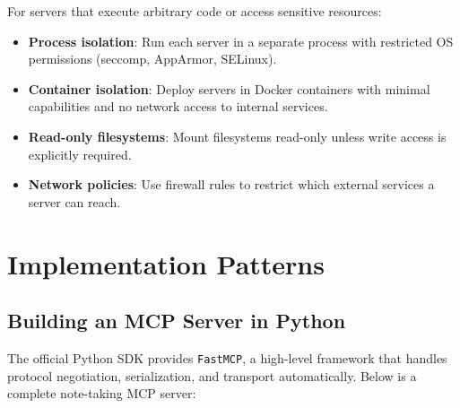 For servers that execute arbitrary code or access sensitive resources:

\begin{itemize}
  \item \textbf{Process isolation}: Run each server in a separate process with restricted OS permissions (seccomp, AppArmor, SELinux).
  \item \textbf{Container isolation}: Deploy servers in Docker containers with minimal capabilities and no network access to internal services.
  \item \textbf{Read-only filesystems}: Mount filesystems read-only unless write access is explicitly required.
  \item \textbf{Network policies}: Use firewall rules to restrict which external services a server can reach.
\end{itemize}

\section{Implementation Patterns}
\label{sec:mcp:implementation}

\subsection{Building an MCP Server in Python}
\label{building-an-mcp-server-in-python}

The official Python SDK provides \texttt{FastMCP}, a high-level framework that handles protocol negotiation, serialization, and transport automatically. Below is a complete note-taking MCP server:

